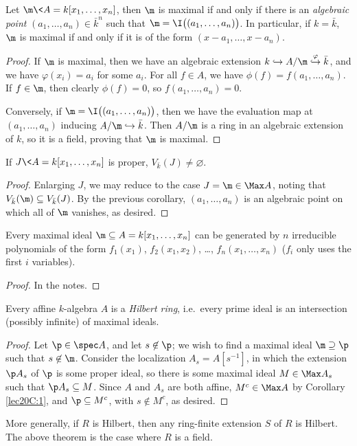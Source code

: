  \begin{corollary}
   Let $\m\< A=k[x_1,\dots, x_n]$, then $\m$ is maximal if and only if there is an
   \emph{algebraic point} $(a_1,\dots, a_n)\in \bar k^n$ such that
   $\m=\I\bigl((a_1,\dots, a_n)\bigr)$. In particular, if $k=\bar k$, $\m$ is maximal if
   and only if it is of the form $(x-a_1,\dots, x-a_n)$.
 \end{corollary}
 \begin{proof}
   If $\m$ is maximal, then we have an algebraic extension $k\hookrightarrow
   A/\m\stackrel{\varphi}{\hookrightarrow} \bar k$, and we have $\varphi(x_i)=a_i$ for
   some $a_i$. For all $f\in A$, we have $\phi(f)=f(a_1,\dots, a_n)$. If $f\in \m$, then
   clearly $\phi(f)=0$, so $f(a_1,\dots, a_n)=0$.

   Conversely, if $\m=\I\bigl((a_1,\dots, a_n)\bigr)$, then we have the evaluation map at
   $(a_1,\dots, a_n)$ inducing $A/\m\hookrightarrow \bar k$. Then $A/\m$ is a ring in an
   algebraic extension of $k$, so it is a field, proving that $\m$ is maximal.
 \end{proof}
 \begin{corollary}
   If $J\< A=k[x_1,\dots, x_n]$ is proper, $V_{\bar k}(J)\neq \varnothing$.
 \end{corollary}
 \begin{proof}
   Enlarging $J$, we may reduce to the case $J=\m\in \Max A$, noting that $V_{\bar
   k}(\m)\subseteq V_{\bar k}(J)$. By the previous corollary, $(a_1,\dots, a_n)$ is an
   algebraic point on which all of $\m$ vanishes, as desired.
 \end{proof}
 \begin{corollary}
   Every maximal ideal $\m\subseteq A=k[x_1,\dots, x_n]$ can be generated by $n$
   irreducible polynomials of the form $f_1(x_1)$, $f_2(x_1,x_2)$, \dots, $f_n(x_1,\dots,
   x_n)$ ($f_i$ only uses the first $i$ variables).
 \end{corollary}
 \begin{proof}
   In the notes. \anton{}
 \end{proof}
 \begin{theorem}
   Every affine $k$-algebra $A$ is a \emph{Hilbert ring}, i.e.\ every prime ideal is an
   intersection (possibly infinite) of maximal ideals.
 \end{theorem}
 \begin{proof}
   Let $\p\in \spec A$, and let $s\not\in \p$; we wish to find a maximal ideal
   $\m\supseteq \p$ such that $s\not\in \m$. Consider the localization $A_s=A[s^{-1}]$,
   in which the extension $\p A_s$ of $\p$ is some proper ideal, so there is some maximal
   ideal $M\in \Max A_s$ such that $\p A_s\subseteq M$. Since $A$ and $A_s$ are both
   affine, $M^c\in \Max A$ by Corollary \ref{lec20C:1}, and $\p\subseteq M^c$, with
   $s\not\in M^c$, as desired.
 \end{proof}
 More generally, if $R$ is Hilbert, then any ring-finite extension $S$ of $R$ is Hilbert.
 The above theorem is the case where $R$ is a field.
 \setcounter{lecture}{21}

